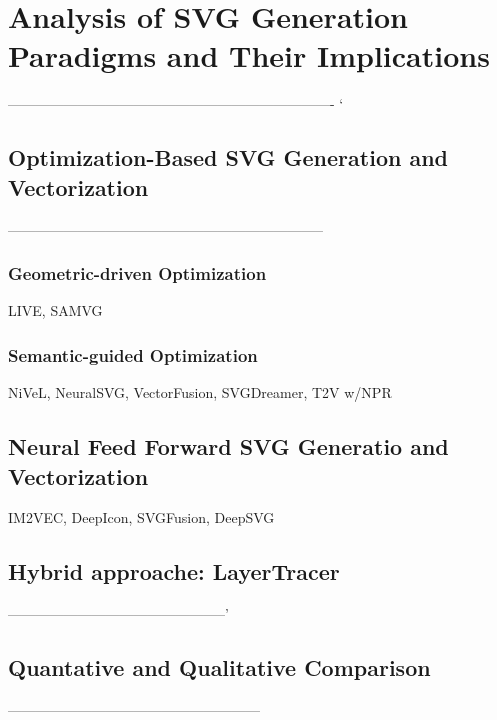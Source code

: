 \chapter{Analysis of SVG Generation Paradigms and Their Implications}
----------------------------------------------------------------------
`\section{Optimization-Based SVG Generation and Vectorization}
--------------------------------------------------------------------
\subsection{Geometric-driven Optimization}
LIVE, SAMVG
\subsection{Semantic-guided Optimization}
NiVeL, NeuralSVG, VectorFusion, SVGDreamer, T2V w/NPR
\section{Neural Feed Forward SVG Generatio and Vectorization}
IM2VEC, DeepIcon, SVGFusion, DeepSVG
\section{Hybrid approache: LayerTracer}
-----------------------------------------------'

\section{Quantative and Qualitative Comparison}
------------------------------------------------------